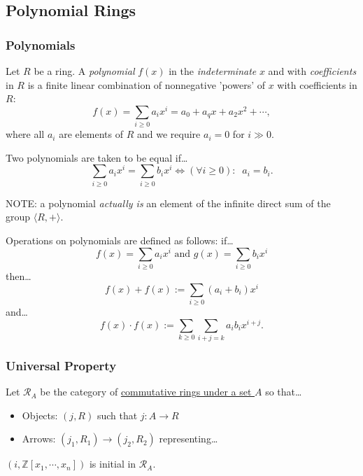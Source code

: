 \subsection{Polynomial Rings}\label{polynomialrings}

\subsubsection{Polynomials}\label{polynomials}
Let $R$ be a ring. A \emph{polynomial} $f(x)$ in the \emph{indeterminate} $x$ and with \emph{coefficients} in $R$
is a finite linear combination of nonnegative 'powers' of $x$ with coefficients in $R$:
$$f(x) = \sum_{i \geq 0} a_i x^i = a_0 + a_qx+a_2x^2 + \cdots,$$
where all $a_i$ are elements of $R$ and we require $a_i = 0$ for $i \gg 0.$\newline

\noindent Two polynomials are taken to be equal if\dots
$$\sum_{i \geq 0} a_i x^i = \sum_{i \geq 0} b_i x^i \Leftrightarrow (\forall i \geq 0): \; \; a_i = b_i.$$

\noindent NOTE: a polynomial \emph{actually is} an element of the infinite direct sum of the group $\langle R,+ \rangle$.\newline

Operations on polynomials are defined as follows: if\dots
$$f(x) = \sum_{i \geq 0} a_i x^i \textrm{ and } g(x) = \sum_{i \geq 0} b_i x^i$$
then\dots
$$f(x) + f(x) := \sum_{i \geq 0} (a_i + b_i) x^i$$
and\dots
$$f(x) \cdot f(x) := \sum_{k \geq 0}\sum_{i+j = k} a_ib_ix^{i+j}.$$

\subsubsection{Universal Property}\label{universalpropertyofpolynomialrings}
Let $\mathcal{R}_A$ be the category of \hyperref[objectsunder]{commutative rings under a set $A$} so that\dots
\begin{itemize}
  \item Objects: $(j, R)$ such that $j : A \rightarrow R$ 
  \item Arrows: $(j_1, R_1) \rightarrow (j_2, R_2)$ representing\dots
  \begin{figure}[H]
	  \centering
	  
  \end{figure}
\end{itemize}

\begin{proposition}
$(i, \mathbb{Z}[x_1,\cdots,x_n])$ is initial in $\mathcal{R}_A$.
\end{proposition}

